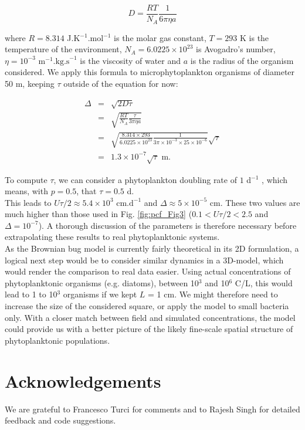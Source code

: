 \begin{equation}
 D=\frac{RT}{N_{A}}\frac{1}{6\pi\eta a}
\end{equation}

where $R=8.314$ J.K$^{-1}$.mol$^{-1}$ is the molar gas constant, $T=293$ K is the temperature of the environment, $N_{A}=6.0225\times10^{23}$ is Avogadro's number, $\eta=10^{-3}\text{ m}^{-1}.\text{kg.s}^{-1}$ is the viscosity of water and $a$ is the radius of the organism considered. We apply this formula to microphytoplankton organisms of diameter 50 \textmu m, keeping $\tau$ outside of the equation for now:

\begin{eqnarray}
\Delta & = & \sqrt{2D\tau}\\
  &= & \sqrt{\frac{RT}{N_{A}}\frac{\tau}{3\pi\eta a}}\\
&=& \sqrt{\frac{8.314\times293}{6.0225\times10^{23}}\frac{1}{3\pi\times10^{-3}\times25\times10^{-6}}}\sqrt{\tau}\\
 & = & 1.3 \times 10^{-7} \sqrt{\tau} \text{ m.}
\end{eqnarray}

To compute $\tau$, we can consider a phytoplankton doubling rate of $1$ d$^{-1}$ \citep{bissinger_predicting_2008}, which means, with $p=0.5$, that $\tau=0.5$ d.\\

This leads to $U\tau/2\approx 5.4\times10^{3} \text{ cm.d}^{-1}$ and $\Delta \approx 5\times10^{-5}$ cm. These two values are much higher than those used in Fig. \ref{fig:pcf_Fig3} ($0.1<U\tau/2<2.5$ and $\Delta=10^{-7}$). A thorough discussion of the parameters is therefore necessary before extrapolating these results to real phytoplanktonic systems. \\

As the Brownian bug model is currently fairly theoretical in its 2D formulation, a logical next step would be to consider similar dynamics in a 3D-model, which would render the comparison to real data easier. Using actual concentrations of phytoplanktonic organisms (e.g. diatoms), between 10$^3$ and 10$^6$ C/L, this would lead to 1 to 10$^3$ organisms if we kept $L$ = 1 cm. We might therefore need to increase the size of the considered square, or apply the model to small bacteria only. With a closer match between field and simulated concentrations, the model could provide us with a better picture of the likely fine-scale spatial structure of phytoplanktonic populations. 

\section*{Acknowledgements}
We are grateful to Francesco Turci for comments and to Rajesh Singh for detailed feedback and code suggestions. 



